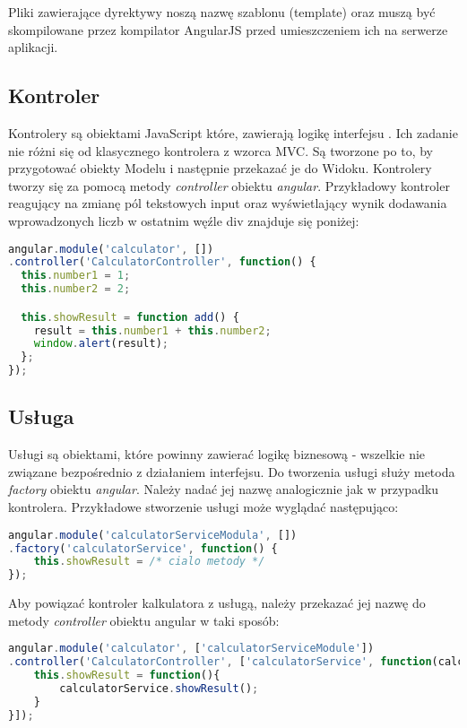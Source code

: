 Pliki zawierające dyrektywy noszą nazwę szablonu (template) oraz muszą być skompilowane przez kompilator AngularJS przed umieszczeniem ich na serwerze aplikacji.

\subsection{Kontroler}
Kontrolery są obiektami JavaScript które, zawierają logikę interfejsu \cite{angular-book}. Ich zadanie nie różni się od klasycznego kontrolera z wzorca MVC. Są tworzone po to, by przygotować obiekty Modelu i następnie przekazać je do Widoku. Kontrolery tworzy się za pomocą metody \textit{controller} obiektu \textit{angular}. Przykładowy kontroler reagujący na zmianę pól tekstowych input oraz wyświetlający wynik dodawania wprowadzonych liczb w ostatnim węźle div znajduje się poniżej:

\begin{lstlisting}[language=JavaScript]
angular.module('calculator', [])
.controller('CalculatorController', function() {
  this.number1 = 1;
  this.number2 = 2;

  this.showResult = function add() {
  	result = this.number1 + this.number2;
    window.alert(result);
  };
});
\end{lstlisting}


\subsection{Usługa}
Usługi są obiektami, które powinny zawierać logikę biznesową - wszelkie nie związane bezpośrednio z działaniem interfejsu. Do tworzenia usługi służy metoda \textit{factory} obiektu \textit{angular}. Należy nadać jej nazwę analogicznie jak w przypadku kontrolera. Przykładowe stworzenie usługi może wyglądać następująco:
\begin{lstlisting}[language=JavaScript]
angular.module('calculatorServiceModula', [])
.factory('calculatorService', function() {
	this.showResult = /* cialo metody */
});
\end{lstlisting}

Aby powiązać kontroler kalkulatora z usługą, należy przekazać jej nazwę do metody \textit{controller} obiektu angular w taki sposób:
\begin{lstlisting}[language=JavaScript]
angular.module('calculator', ['calculatorServiceModule'])
.controller('CalculatorController', ['calculatorService', function(calculatorService) {
	this.showResult = function(){
		calculatorService.showResult();
	}
}]);
\end{lstlisting}


